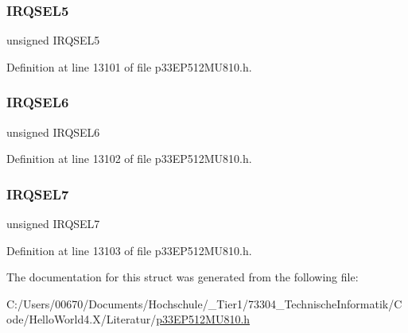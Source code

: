 \subsubsection{\texorpdfstring{I\+R\+Q\+S\+E\+L5}{IRQSEL5}}
{\footnotesize\ttfamily unsigned I\+R\+Q\+S\+E\+L5}



Definition at line 13101 of file p33\+E\+P512\+M\+U810.\+h.

\mbox{\label{structtag_d_m_a6_r_e_q_b_i_t_s_ace52408ef8c29561f3c56a3fbcbc8217}} 
\subsubsection{\texorpdfstring{I\+R\+Q\+S\+E\+L6}{IRQSEL6}}
{\footnotesize\ttfamily unsigned I\+R\+Q\+S\+E\+L6}



Definition at line 13102 of file p33\+E\+P512\+M\+U810.\+h.

\mbox{\label{structtag_d_m_a6_r_e_q_b_i_t_s_acce7dedecdf1f53cdbead3edf7c5d53a}} 
\subsubsection{\texorpdfstring{I\+R\+Q\+S\+E\+L7}{IRQSEL7}}
{\footnotesize\ttfamily unsigned I\+R\+Q\+S\+E\+L7}



Definition at line 13103 of file p33\+E\+P512\+M\+U810.\+h.



The documentation for this struct was generated from the following file\+:\begin{DoxyCompactItemize}
\item 
C\+:/\+Users/00670/\+Documents/\+Hochschule/\+\_\+\+Tier1/73304\+\_\+\+Technische\+Informatik/\+Code/\+Hello\+World4.\+X/\+Literatur/\hyperlink{p33_e_p512_m_u810_8h}{p33\+E\+P512\+M\+U810.\+h}\end{DoxyCompactItemize}
